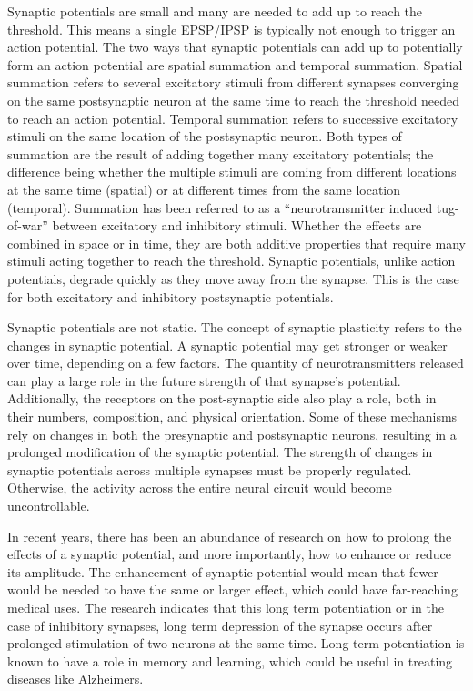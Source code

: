 \documentclass[]{book}
\begin{document}
Synaptic potentials are small and many are needed to add up to reach the threshold. This means a single EPSP/IPSP is typically not enough to trigger an action potential. The two ways that synaptic potentials can add up to potentially form an action potential are spatial summation and temporal summation. Spatial summation refers to several excitatory stimuli from different synapses converging on the same postsynaptic neuron at the same time to reach the threshold needed to reach an action potential. Temporal summation refers to successive excitatory stimuli on the same location of the postsynaptic neuron. Both types of summation are the result of adding together many excitatory potentials; the difference being whether the multiple stimuli are coming from different locations at the same time (spatial) or at different times from the same location (temporal). Summation has been referred to as a ``neurotransmitter induced tug-of-war'' between excitatory and inhibitory stimuli. Whether the effects are combined in space or in time, they are both additive properties that require many stimuli acting together to reach the threshold. Synaptic potentials, unlike action potentials, degrade quickly as they move away from the synapse. This is the case for both excitatory and inhibitory postsynaptic potentials.

Synaptic potentials are not static. The concept of synaptic plasticity refers to the changes in synaptic potential. A synaptic potential may get stronger or weaker over time, depending on a few factors. The quantity of neurotransmitters released can play a large role in the future strength of that synapse's potential. Additionally, the receptors on the post-synaptic side also play a role, both in their numbers, composition, and physical orientation. Some of these mechanisms rely on changes in both the presynaptic and postsynaptic neurons, resulting in a prolonged modification of the synaptic potential. The strength of changes in synaptic potentials across multiple synapses must be properly regulated. Otherwise, the activity across the entire neural circuit would become uncontrollable.

In recent years, there has been an abundance of research on how to prolong the effects of a synaptic potential, and more importantly, how to enhance or reduce its amplitude. The enhancement of synaptic potential would mean that fewer would be needed to have the same or larger effect, which could have far-reaching medical uses. The research indicates that this long term potentiation or in the case of inhibitory synapses, long term depression of the synapse occurs after prolonged stimulation of two neurons at the same time. Long term potentiation is known to have a role in memory and learning, which could be useful in treating diseases like Alzheimers.
\end{document}
